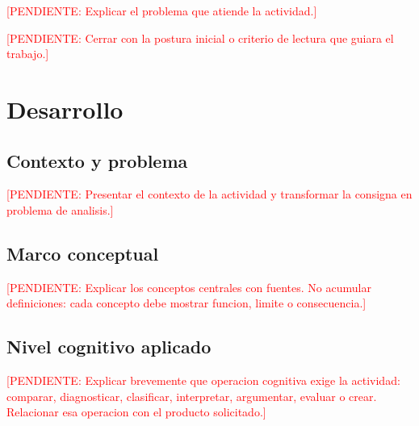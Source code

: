 \documentclass[
	spanish,
	letterpaper, oneside
]{article}
\newcommand{\pendiente}[1]{\textcolor{red}{[PENDIENTE: #1]}}
\begin{document}
\pendiente{Explicar el problema que atiende la actividad.}

\pendiente{Cerrar con la postura inicial o criterio de lectura que guiara el trabajo.}

%
%
\section{Desarrollo}

\subsection{Contexto y problema}

\pendiente{Presentar el contexto de la actividad y transformar la consigna en problema de analisis.}

\subsection{Marco conceptual}

\pendiente{Explicar los conceptos centrales con fuentes. No acumular definiciones: cada concepto debe mostrar funcion, limite o consecuencia.}

\subsection{Nivel cognitivo aplicado}

\pendiente{Explicar brevemente que operacion cognitiva exige la actividad: comparar, diagnosticar, clasificar, interpretar, argumentar, evaluar o crear. Relacionar esa operacion con el producto solicitado.}
\end{document}
